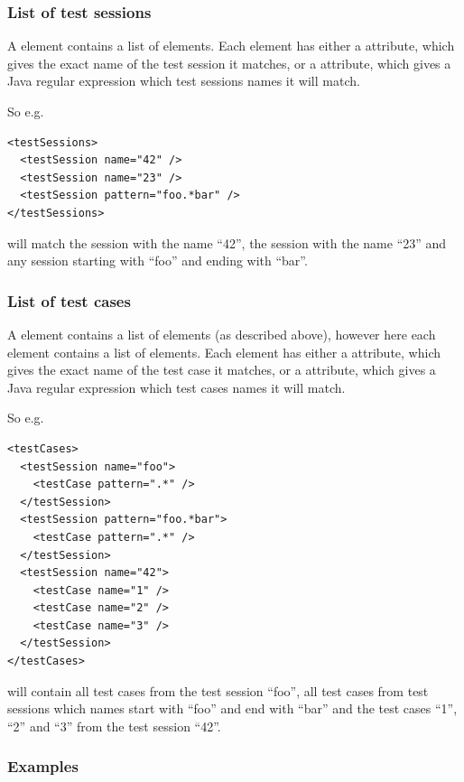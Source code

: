\subsubsection{List of test sessions} \label{fr:ANT TestSession List}

A  element contains a list of  elements.
Each  element has either a  attribute, which
gives the exact name of the test session it matches, or a 
attribute, which gives a Java regular expression which test sessions names
it will match.

So e.g.
\begin{verbatim}
<testSessions>
  <testSession name="42" />
  <testSession name="23" />
  <testSession pattern="foo.*bar" />
</testSessions>
\end{verbatim}
will match the session with the name ``42'', the session with the name ``23''
and any session starting with ``foo'' and ending with ``bar''.

\subsubsection{List of test cases} \label{fr:ANT TestCase List}

A  element contains a list of  elements (as
described above), however here each  element contains a list
of  elements.
Each  element has either a  attribute, which
gives the exact name of the test case it matches, or a 
attribute, which gives a Java regular expression which test cases names
it will match.

So e.g.
\begin{verbatim}
<testCases>
  <testSession name="foo">
    <testCase pattern=".*" />
  </testSession>
  <testSession pattern="foo.*bar">
    <testCase pattern=".*" />
  </testSession>
  <testSession name="42">
    <testCase name="1" />
    <testCase name="2" />
    <testCase name="3" />
  </testSession>
</testCases>
\end{verbatim}
will contain all test cases from the test session ``foo'', all test cases from
test sessions which names start with ``foo'' and end with ``bar'' and the test
cases ``1'', ``2'' and ``3'' from the test session ``42''.

\subsubsection{Examples}

